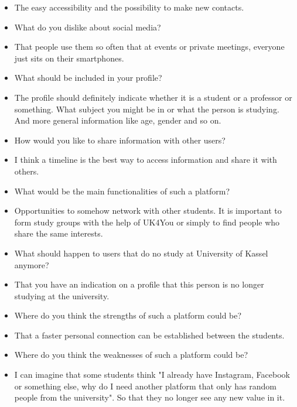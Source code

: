 {\begin{itemize}[]
    \item {} The easy accessibility and the possibility to make new contacts.
    \item {} What do you dislike about social media?
    \item {} That people use them so often that at events or private meetings, everyone just sits on their smartphones.
    \item {} What should be included in your profile?
    \item {} The profile should definitely indicate whether it is a student or a professor or something. What subject you might be in or what the person is studying. And more general information like age, gender and so on.
    \item {} How would you like to share information with other users?
    \item {} I think a timeline is the best way to access information and share it with others.
    \item {} What would be the main functionalities of such a platform?
    \item {} Opportunities to somehow network with other students. It is important to form study groups with the help of UK4You or simply to find people who share the same interests.
    \item {} What should happen to users that do no study at University of Kassel anymore?
    \item {} That you have an indication on a profile that this person is no longer studying at the university.
    \item {} Where do you think the strengths of such a platform could be?
    \item {} That a faster personal connection can be established between the students.
    \item {} Where do you think the weaknesses of such a platform could be?
    \item {} I can imagine that some students think "I already have Instagram, Facebook or something else, why do I need another platform that only has random people from the university". So that they no longer see any new value in it.
\end{itemize}}
\nolinenumbers
